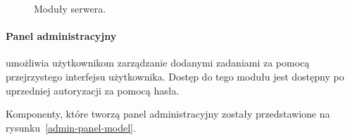\documentclass[a4paper,11pt,twoside]{report}
\theoremstyle{definition}
\begin{document}
\begin{figure} 
    \caption{Moduły serwera.}
    \label{server-model}
\end{figure}

\paragraph{Panel administracyjny}

umożliwia użytkownikom zarządzanie dodanymi zadaniami za pomocą przejrzystego interfejsu użytkownika. Dostęp do tego modułu jest dostępny po uprzedniej autoryzacji za pomocą hasła. 

Komponenty, które tworzą panel administracyjny zostały przedstawione na rysunku~\ref{admin-panel-model}. 
\end{document}
